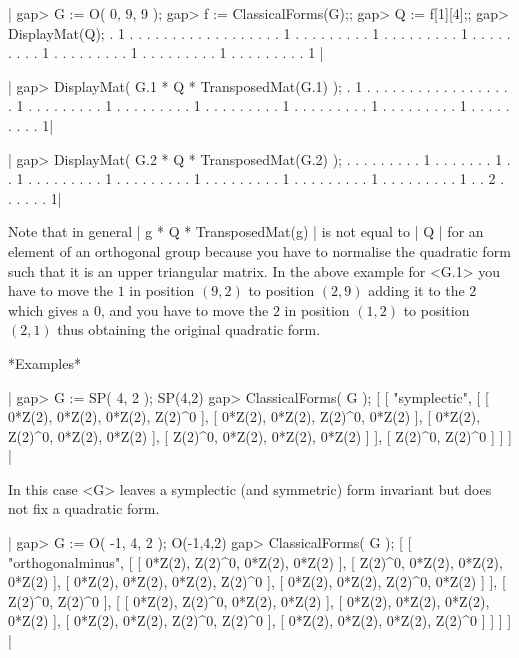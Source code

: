 \vspace{3mm}
\vbox{
|    gap> G := O( 0, 9, 9 );
    gap> f := ClassicalForms(G);;
    gap> Q := f[1][4];;
    gap> DisplayMat(Q);
     . 1 . . . . . . .
     . . . . . . . . .
     . . 1 . . . . . .
     . . . 1 . . . . .
     . . . . 1 . . . .
     . . . . . 1 . . .
     . . . . . . 1 . .
     . . . . . . . 1 .
     . . . . . . . . 1 |
}

\vbox{
|    gap> DisplayMat( G.1 * Q * TransposedMat(G.1) );
     . 1 . . . . . . .
     . . . . . . . . .
     . . 1 . . . . . .
     . . . 1 . . . . .
     . . . . 1 . . . .
     . . . . . 1 . . .
     . . . . . . 1 . .
     . . . . . . . 1 .
     . . . . . . . . 1|
}

\vbox{
|    gap> DisplayMat( G.2 * Q * TransposedMat(G.2) );
     . . . . . . . . .
     1 . . . . . . . 1
     . . 1 . . . . . .
     . . . 1 . . . . .
     . . . . 1 . . . .
     . . . . . 1 . . .
     . . . . . . 1 . .
     . . . . . . . 1 .
     . 2 . . . . . . 1|
}


Note that in general | g *  Q * TransposedMat(g) | is  not equal to | Q |
for an element of an  orthogonal group because  you have to normalise the
quadratic form such that it is an upper triangular  matrix.  In the above
example  for  <G.1> you have   to  move the  $1$  in  position $(9,2)$ to
position $(2,9)$ adding it to the $2$ which gives  a $0$, and you have to
move  the $2$ in position $(1,2)$  to position $(2,1)$ thus obtaining the
original quadratic form.

*Examples*

|    gap> G := SP( 4, 2 );
    SP(4,2)
    gap> ClassicalForms( G );
    [ [ "symplectic", 
      [ [ 0*Z(2), 0*Z(2), 0*Z(2), Z(2)^0 ],
        [ 0*Z(2), 0*Z(2), Z(2)^0, 0*Z(2) ],
        [ 0*Z(2), Z(2)^0, 0*Z(2), 0*Z(2) ], 
        [ Z(2)^0, 0*Z(2), 0*Z(2), 0*Z(2) ] ],
      [ Z(2)^0, Z(2)^0 ] ] ] |

In this  case <G> leaves a  symplectic (and symmetric) form invariant but
does not fix a quadratic form.

|    gap> G := O( -1, 4, 2 );
    O(-1,4,2)
    gap> ClassicalForms( G );
    [ [ "orthogonalminus", 
        [ [ 0*Z(2), Z(2)^0, 0*Z(2), 0*Z(2) ],
          [ Z(2)^0, 0*Z(2), 0*Z(2), 0*Z(2) ],
          [ 0*Z(2), 0*Z(2), 0*Z(2), Z(2)^0 ], 
          [ 0*Z(2), 0*Z(2), Z(2)^0, 0*Z(2) ] ],
        [ Z(2)^0, Z(2)^0 ], 
        [ [ 0*Z(2), Z(2)^0, 0*Z(2), 0*Z(2) ],
          [ 0*Z(2), 0*Z(2), 0*Z(2), 0*Z(2) ],
          [ 0*Z(2), 0*Z(2), Z(2)^0, Z(2)^0 ], 
          [ 0*Z(2), 0*Z(2), 0*Z(2), Z(2)^0 ] ] ] ] |


